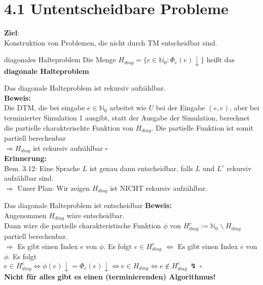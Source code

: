 
\section*{4.1 Untentscheidbare Probleme}

\textbf{Ziel}: \\
Konstruktion von Problemen, die nicht durch TM entscheidbar sind.

\begin{defn}{diagonales Halteproblem}
    Die Menge $H_{diag} = \{e \in \mathbb{N}_0 : \Phi_e(e) \downarrow\}$ heißt das \textbf{diagonale Halteproblem}
\end{defn}

\begin{prop}{}
    Das diagonale Halteproblem ist rekursiv aufzählbar. \\
    
    \textbf{Beweis:} \\
    Die DTM, die bei eingabe $e \in \mathbb{N}_0$ arbeitet wie $U$ bei
    der Eingabe $(e,e)$, aber bei terminierter Simulation 1 ausgibt, statt der
    Ausgabe der Simulation, berechnet die partielle charakterischte Funktion von $H_{diag}$.
    Die partielle Funktion ist somit partiell berechenbar \\
    $\Rightarrow H_{diag}$ ist rekursiv aufzählbar $\square$ \\

    \textbf{Erinnerung:} \\
    Bem. 3.12: Eine Sprache $L$ ist genau dann entscheidbar, falls $L$ und $L^c$
    rekursiv aufzählbar sind. \\

    $\Rightarrow$ Unser Plan: Wir zeigen $H_{diag}$ ist NICHT rekursiv aufzählbar.
\end{prop}

\begin{satz}{Das diagonale Halteproblem ist entscheidbar}
    \textbf{Beweis:} \\
    Angenommen $H_{diag}$ wäre entscheidbar. \\
    Dann wäre die partielle charakteristische Funktion $\phi$ von $H_{diag}^c := \mathbb{N}_0 \backslash H_{diag}$
    partiell berechenbar. \\

    $\Rightarrow$ Es gibt einen Index $e$ von $\phi$. Es folgt $e \in H_{diag}^c$
    $\Leftrightarrow$ Es gibt einen Index $e$ von $\phi$. Es folgt \\
    $e \in H_{diag}^c \Leftrightarrow \phi(e)\downarrow = \Phi_e(e)\downarrow \Leftrightarrow e \in H_{diag} \Leftrightarrow e \notin H_{diag}^c \, \lightning \, \square$ \\

    \textbf{Nicht für alles gibt es einen (terminierenden) Algorithmus!}
\end{satz}

